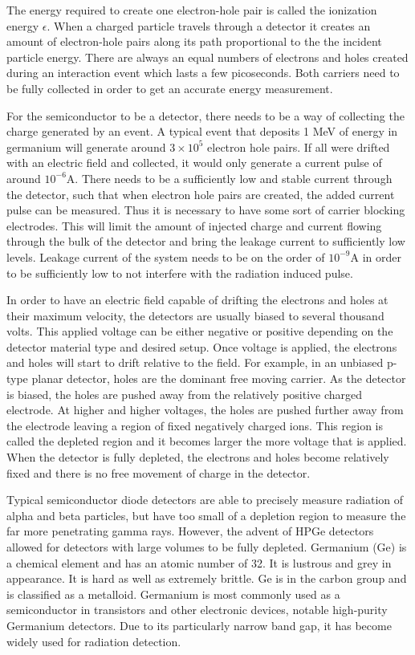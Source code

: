 The energy required to create one electron-hole pair is called the ionization energy $\epsilon$.
When a charged particle travels through a detector it creates an amount of electron-hole pairs along its path proportional to the the incident particle energy.
There are always an equal numbers of electrons and holes created during an interaction event which lasts a few picoseconds.
Both carriers need to be fully collected in order to get an accurate energy measurement.

For the semiconductor to be a detector, there needs to be a way of collecting the charge generated by an event.
A typical event that deposits 1 MeV of energy in germanium will generate around $3\times 10^{5}$ electron hole pairs.
If all were drifted with an electric field and collected, it would only generate a current pulse of around $10^{-6}$A.
There needs to be a sufficiently low and stable current through the detector, such that when electron hole pairs are created, the added current pulse can be measured.
Thus it is necessary to have some sort of carrier blocking electrodes.
This will limit the amount of injected charge and current flowing through the bulk of the detector and bring the leakage current to sufficiently low levels.
Leakage current of the system needs to be on the order of $10^{-9}$A in order to be sufficiently low to not interfere with the radiation induced pulse.

In order to have an electric field capable of drifting the electrons and holes at their maximum velocity, the detectors are usually biased to several thousand volts.
This applied voltage can be either negative or positive depending on the detector material type and desired setup.
Once voltage is applied, the electrons and holes will start to drift relative to the field.
For example, in an unbiased p-type planar detector, holes are the dominant free moving carrier.
As the detector is biased, the holes are pushed away from the relatively positive charged electrode.
At higher and higher voltages, the holes are pushed further away from the electrode leaving a region of fixed negatively charged ions.
This region is called the depleted region and it becomes larger the more voltage that is applied.
When the detector is fully depleted, the electrons and holes become relatively fixed and there is no free movement of charge in the detector.

Typical semiconductor diode detectors are able to precisely measure radiation of alpha and beta particles, but have too small of a depletion region to measure the far more penetrating gamma rays.
However, the advent of HPGe detectors allowed for detectors with large volumes to be fully depleted.
Germanium (Ge) is a chemical element and has an atomic number of 32.
It is lustrous and grey in appearance.
It is hard as well as extremely brittle.
Ge is in the carbon group and is classified as a metalloid.
Germanium is most commonly used as a semiconductor in transistors and other electronic devices, notable high-purity Germanium detectors.
Due to its particularly narrow band gap, it has become widely used for radiation detection. 

